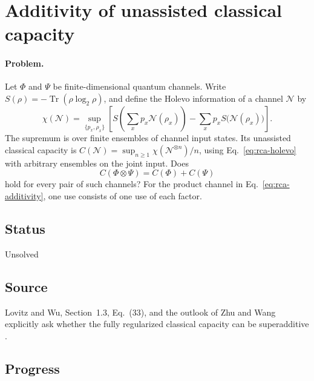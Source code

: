 \section{Additivity of unassisted classical capacity}
\label{sec:op_382825d5d6cb3224}

\paragraph{Problem.}
Let $\Phi$ and $\Psi$ be finite-dimensional quantum channels. Write $S(\rho)=-\operatorname{Tr}(\rho\log_2\rho)$, and define the Holevo information of a channel $\mathcal N$ by
\begin{equation}
  \chi(\mathcal N)=\sup_{\{p_x,\rho_x\}}\left[
    S\!\left(\sum_x p_x\mathcal N(\rho_x)\right)
    -\sum_xp_x S\bigl(\mathcal N(\rho_x)\bigr)\right].
  \label{eq:rca-holevo}
\end{equation}
The supremum is over finite ensembles of channel input states. Its unassisted classical capacity is $C(\mathcal N)=\sup_{n\geq1}\chi(\mathcal N^{\otimes n})/n$, using Eq.~\eqref{eq:rca-holevo} with arbitrary ensembles on the joint input. Does
\begin{equation}
 C(\Phi\otimes\Psi)=C(\Phi)+C(\Psi)
 \label{eq:rca-additivity}
\end{equation}
hold for every pair of such channels? For the product channel in Eq.~\eqref{eq:rca-additivity}, one use consists of one use of each factor.

\subsection*{Status}

Unsolved

\subsection*{Source}

Lovitz and Wu, Section~1.3, Eq.~(33), and the outlook of Zhu and Wang explicitly ask whether the fully regularized classical capacity can be superadditive  .

\subsection*{Progress}


